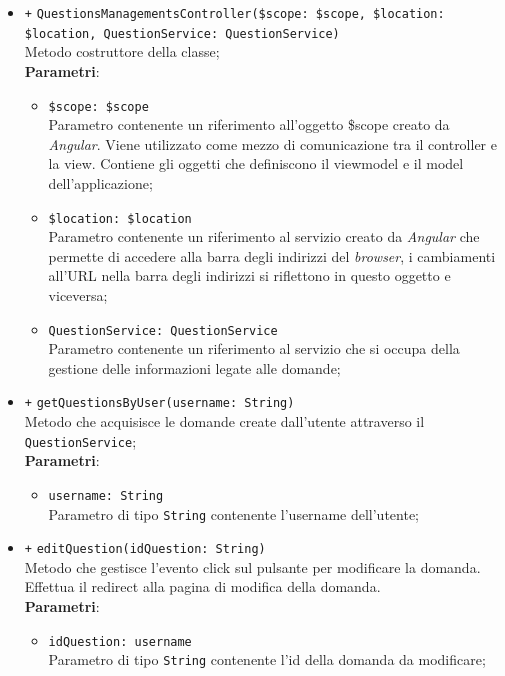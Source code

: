 \begin{itemize}
\begin{itemize}
		\item \texttt{+} \texttt{QuestionsManagementsController(\$scope: \$scope, \$location: \$location, QuestionService: QuestionService)} \\ 
		Metodo costruttore della classe; \\
		\textbf{Parametri}:
		\begin{itemize}
			\item \texttt{\$scope: \$scope} \\
			Parametro contenente un riferimento all’oggetto \$scope creato da \textit{Angular}. Viene utilizzato come mezzo di comunicazione tra il controller e la view. Contiene gli oggetti che definiscono il viewmodel e il model dell’applicazione;
			\item \texttt{\$location: \$location} \\
			Parametro contenente un riferimento al servizio creato da \textit{Angular} che permette di accedere alla barra degli indirizzi del \textit{browser}, i cambiamenti all’URL nella barra degli indirizzi si riflettono in questo oggetto e viceversa;
			\item \texttt{QuestionService: QuestionService} \\
			Parametro contenente un riferimento al servizio che si occupa della gestione delle informazioni legate alle domande;
		\end{itemize}
		\item \texttt{+} \texttt{getQuestionsByUser(username: String)} \\ 
		Metodo che acquisisce le domande create dall'utente attraverso il \texttt{QuestionService};\\
		\textbf{Parametri}:
		\begin{itemize}
			\item \texttt{username: String} \\
			Parametro di tipo \texttt{String} contenente l'username dell'utente;
		\end{itemize}
		\item \texttt{+} \texttt{editQuestion(idQuestion: String)} \\ 
		Metodo che gestisce l’evento click sul pulsante per modificare la domanda. Effettua il redirect alla pagina di modifica della domanda. \\
		\textbf{Parametri}:
		\begin{itemize}
			\item \texttt{idQuestion: username} \\
			Parametro di tipo \texttt{String} contenente l'id della domanda da modificare;
		\end{itemize}
	\end{itemize}
\end{itemize}

